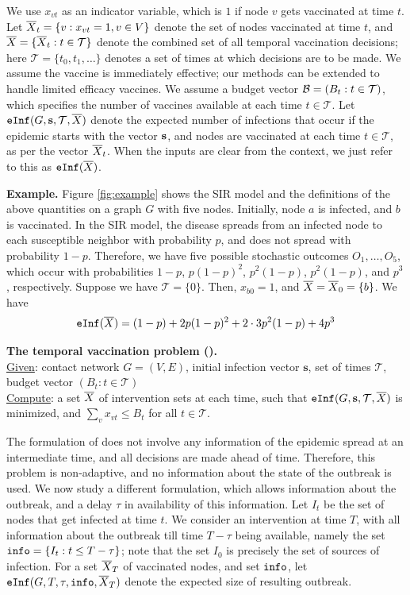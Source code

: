 We use $x_{vt}$ as an indicator variable, which is $1$ if node $v$ gets vaccinated at time $t$.
Let $\overline{X}_t=\{v: x_{vt}=1, v\in V\}$ denote the set of nodes vaccinated at time $t$, and 
$\overline{X}=\{\overline{X}_t: t\in\mathcal{T}\}$ denote the combined set of all temporal vaccination
decisions; here $\mathcal{T}=\{t_0, t_1,\ldots\}$ denotes a set of times at which decisions are to be made.
We assume the vaccine is immediately effective; our methods can be extended to handle limited efficacy vaccines.
We assume a budget vector $\mathcal{B}=(B_t: t\in\mathcal{T})$, which specifies the number of vaccines available
at each time $t\in\mathcal{T}$.
Let $\texttt{eInf}(G, \mathbf{s}, \mathcal{T}, \overline{X})$ denote the expected number of infections that occur if the epidemic
starts with the vector $\mathbf{s}$, and nodes are vaccinated at each time $t\in\mathcal{T}$, as per the vector $\overline{X}_t$.
When the inputs are clear from the context, we just refer to this as $\texttt{eInf}(\overline{X})$.

\noindent
\textbf{Example.} Figure \ref{fig:example} shows the SIR model and the definitions of the above quantities
on a graph $G$ with five nodes. Initially, node $a$ is infected, and $b$ is vaccinated. 
In the SIR model, the disease spreads from an infected node to each susceptible neighbor with probability $p$,
and does not spread with probability $1-p$. Therefore, we have five possible stochastic outcomes $O_1,\ldots,O_5$,
which occur with probabilities $1-p$, $p(1-p)^2$, $p^2(1-p)$, $p^2(1-p)$, and $p^3$, respectively.
Suppose we have $\mathcal{T}=\{0\}$. Then, $x_{b0}=1$, and $\overline{X}=\overline{X}_0=\{b\}$.
We have 
\[
\texttt{eInf}(\overline{X})= (1-p) +2p(1-p)^2+2\cdot 3 p^2(1-p) + 4p^3
\]

\noindent
\textbf{The temporal vaccination problem (\prob).}\\
\underline{Given}: contact network $G=(V, E)$, initial infection vector $\mathbf{s}$, set of times $\mathcal{T}$,
budget vector $(B_t: t\in\mathcal{T})$\\
\underline{Compute}: a set $\overline{X}$ of intervention sets at each time, 
such that $\texttt{eInf}(G, \mathbf{s}, \mathcal{T}, \overline{X})$ is minimized, and $\sum_v x_{vt} \leq B_t$ for all $t\in\mathcal{T}$.


The formulation of \prob{} does not involve any information of the epidemic spread at an intermediate
time, and all decisions are made ahead of time. Therefore, this problem is non-adaptive, and no information
about the state of the outbreak is used. We now study a different formulation, which allows information about
the outbreak, and a delay $\tau$ in availability of this information. Let $I_t$ be the set of nodes that
get infected at time $t$.
We consider an intervention at time $T$, with all information about the outbreak till time $T-\tau$ being available,
namely the set $\texttt{info}=\{I_t: t\leq T-\tau\}$; note that the set $I_0$ is precisely the set of sources of infection.
For a set $\overline{X}_T$ of vaccinated nodes, and set $\texttt{info}$, let $\texttt{eInf}(G, T, \tau, \texttt{info}, \overline{X}_T)$ denote the expected size of
resulting outbreak. 

